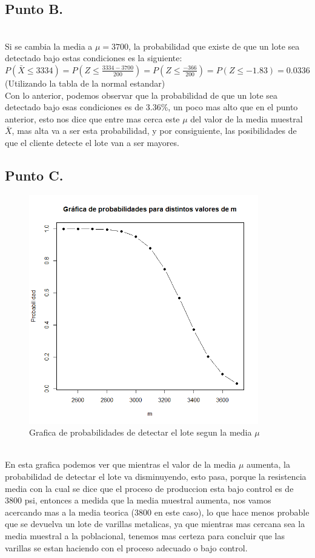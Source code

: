 \documentclass[letterpaper,12pt,onecolumn,titlepage]{article}
\begin{document}
\subsection{Punto B.}
~\\ Si se cambia la media a $\mu=3700$, la probabilidad que existe de que un lote sea detectado bajo estas condiciones es la siguiente:
~\\ $P(\bar{X}\leq3334)=P(Z\leq\frac{3334-3700}{200})=P(Z\leq\frac{-366}{200})=P(Z\leq-1.83)=0.0336$ (Utilizando la tabla de la normal estandar)
~\\ Con lo anterior, podemos observar que la probabilidad de que un lote sea detectado bajo esas condiciones es de 3.36\%, un poco mas alto que en el punto anterior, esto nos dice que entre mas cerca este $\mu$ del valor de la media muestral $\bar{X}$, mas alta va a ser esta probabilidad, y por consiguiente, las posibilidades de que el cliente detecte el lote van a ser mayores.
\pagebreak \subsection{Punto C.}
\begin{figure}[!h]
    \begin{center}
        \includegraphics[width=10cm]{Figuras/5.png}
        \caption{Grafica de probabilidades de detectar el lote segun la media $\mu$}
        \label{fig:Densidad}
    \end{center}
\end{figure}
~\\ En esta grafica podemos ver que mientras el valor de la media $\mu$ aumenta, la probabilidad de detectar el lote va disminuyendo, esto pasa, porque la resistencia media con la cual se dice que el proceso de produccion esta bajo control es de 3800 psi, entonces a medida que la media muestral aumenta, nos vamos acercando mas a la media teorica (3800 en este caso), lo que hace menos probable que se devuelva un lote de varillas metalicas, ya que mientras mas cercana sea la media muestral a la poblacional, tenemos mas certeza para concluir que las varillas se estan haciendo con el proceso adecuado o bajo control.

\end{document}
